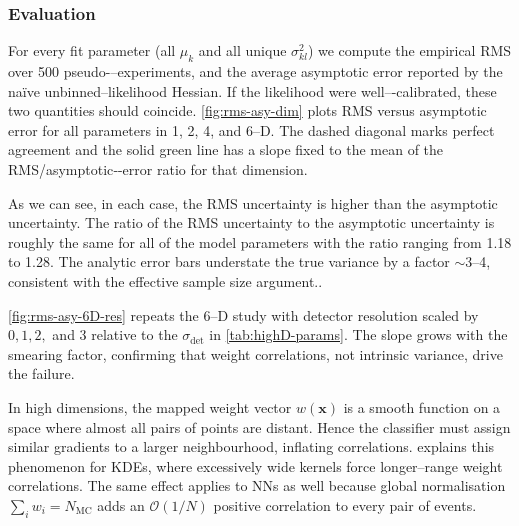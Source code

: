         \subsubsection{Evaluation}
            For every fit parameter (all $\mu_k$ and all unique $\sigma^2_{kl}$) we compute the {empirical RMS} over 500 pseudo-–experiments, and the average asymptotic error reported by the naïve unbinned–likelihood Hessian.
            If the likelihood were well–-calibrated, these two quantities
            should coincide.
            \cref{fig:rms-asy-dim} plots RMS versus asymptotic error for all parameters in 1, 2, 4, and 6--D.
            The dashed diagonal marks perfect agreement and the solid green line has a slope fixed to the mean of the RMS/asymptotic‐-error ratio for that dimension.
            
            As we can see, in each case, the RMS uncertainty is higher than the asymptotic uncertainty.
            The ratio of the RMS uncertainty to the asymptotic uncertainty is roughly the same for all of the model parameters with the ratio ranging from 1.18 to 1.28.
            The analytic error bars understate the true variance by a factor $\sim\!3$–4, consistent with the effective sample size argument..
            
            \cref{fig:rms-asy-6D-res} repeats the 6--D study with detector resolution scaled by $0,1,2,$ and $3$ relative to the $\sigma_{\det}$ in \cref{tab:highD-params}.
            The slope grows with the smearing factor, confirming that weight correlations, not intrinsic variance, drive the failure.

            In high dimensions, the mapped weight vector $w(\mathbf{x})$ is a smooth function on a space where almost all pairs of points are distant.
            Hence the classifier must assign similar gradients to a larger neighbourhood, inflating correlations.
             explains this phenomenon for KDEs, where excessively wide kernels force longer--range weight correlations.
            The same effect applies to NNs as well because global normalisation $\sum_i w_i=N_{\text{MC}}$ adds an $\mathcal O(1/N)$ positive correlation to {every} pair of events.


